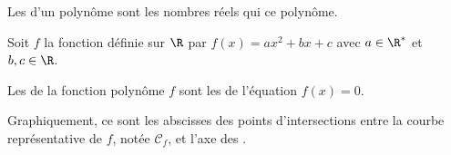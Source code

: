 \begin{Definition}
    Les d'un polynôme sont les nombres réels qui  ce polynôme.
    
    \begin{Remarque}[]
        Soit $f$ la fonction définie sur $\R$ par $f(x) = ax^2+bx+c$ avec $a \in \R^*$ et $b,c \in \R$. 
        

        Les  de la fonction polynôme $f$ sont les  de l'équation $f(x)=0$. 


        Graphiquement, ce sont les abscisses des points d'intersections entre la courbe représentative de $f$, notée $\mathcal{C}_f$, et l'axe des .
    \end{Remarque}
\end{Definition}